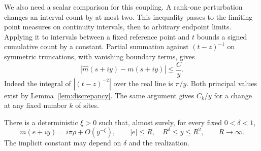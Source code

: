 We also need a scalar comparison for this coupling. A rank-one
perturbation changes an interval count by at most two. This inequality
passes to the limiting point measures on continuity intervals, then
to arbitrary endpoint limits. Applying it to intervals between a
fixed reference point and $t$ bounds a signed cumulative count by a
constant. Partial summation against $(t-z)^{-1}$ on symmetric
truncations, with vanishing boundary terms, gives
\begin{equation}\label{eq:rank-one-scalar-difference}
             |\widehat m(s+iy)-m(s+iy)|\le \frac C y.
\end{equation}
Indeed the integral of $|(t-z)^{-2}|$ over the real line is
$\pi/y$. Both principal values exist by
Lemma~\ref{lem:discrepancy}. The same argument gives $C_k/y$ for a
change at any fixed number $k$ of sites.

\begin{proposition}\label{prop:transform-regularity}
There is a deterministic $\xi>0$ such that, almost surely, for every
fixed $0<\delta<1$,
\begin{equation}\label{eq:transform-regularity}
 m(e+iy)=i\pi\rho+O(y^{-\xi}),
 \qquad |e|\le R,\quad R^\delta\le y\le R^2,
 \qquad R\longrightarrow\infty.
\end{equation}
The implicit constant may depend on $\delta$ and the realization.
\end{proposition}

